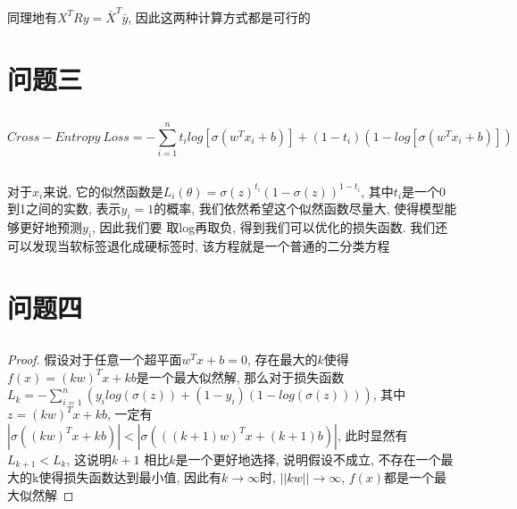 \documentclass[12pt, a4paper]{article}
\begin{document}
同理地有$X^TRy = \bar{X}^T \bar{y}$, 因此这两种计算方式都是可行的

\section{问题三}


\subsection{}

\begin{equation*}
    Cross-Entropy \ Loss = - \sum_{i=1}^n t_i log[\sigma(w^T x_i + b)] + (1-t_i)(1-log[\sigma(w^T x_i + b)])
\end{equation*}

\subsection{}

对于$x_i$来说, 它的似然函数是$L_i(\theta) = \sigma(z)^{t_i}(1-\sigma(z))^{1-t_i} $, 其中$t_i$是一个0到1之间的实数, 表示$y_i=1$的概率, 
我们依然希望这个似然函数尽量大, 使得模型能够更好地预测$y_i$, 因此我们要
取log再取负, 得到我们可以优化的损失函数. 我们还可以发现当软标签退化成硬标签时, 该方程就是一个普通的二分类方程

\section{问题四}


\subsection{}

\newtheorem*{proof}{Proof}

\begin{proof}
    假设对于任意一个超平面$w^T x + b = 0$, 存在最大的$k$使得$f(x) = (kw)^T x + kb$是一个最大似然解, 
    那么对于损失函数$L_k = - \sum_{i=1}^n(y_i log(\sigma(z))+(1-y_i)(1-log(\sigma(z))))$, 其中$z = (kw)^T x + kb$, 
    一定有$|\sigma((kw)^T x + kb)| < |\sigma(((k+1)w)^T x + (k+1)b)|$, 此时显然有$L_{k+1}<L_k$, 这说明$k+1$
    相比$k$是一个更好地选择, 说明假设不成立, 不存在一个最大的k使得损失函数达到最小值, 因此有$k \rightarrow \infty$时, 
    $||kw|| \rightarrow \infty$, $f(x)$都是一个最大似然解
\end{proof}

\subsection{}
\end{document}
